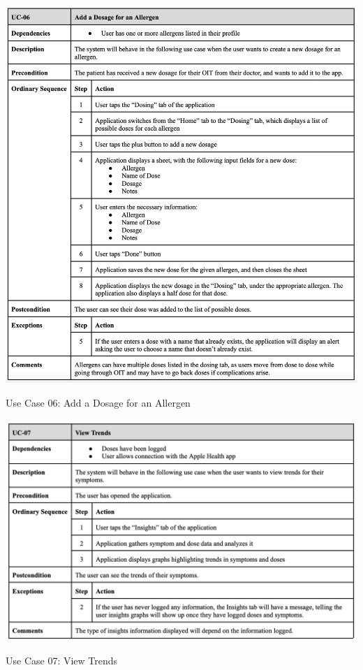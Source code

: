 \begin{table} [H]
    \centering
    \includegraphics[width=1\linewidth]{uc-06.png}
    \caption{Use Case 06: Add a Dosage for an Allergen}
    \label{fig:uc06-table}
\end{table}

\begin{table} [H]
    \centering
    \includegraphics[width=1\linewidth]{thesis//chapters//images/uc-07.png}
    \caption{Use Case 07: View Trends}
    \label{fig:uc07-table}
\end{table}

